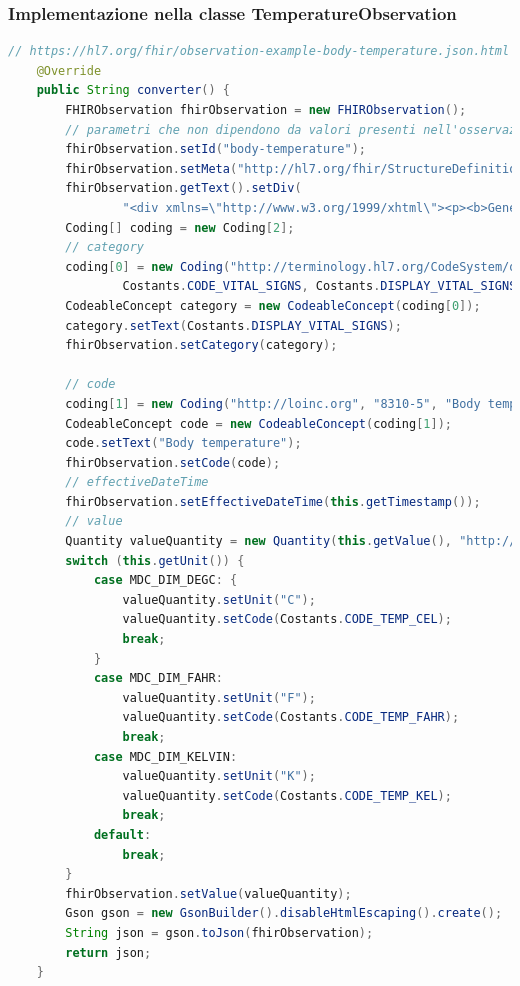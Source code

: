 \documentclass[a4paper]{article}
\begin{document}
\subsubsection*{Implementazione nella classe TemperatureObservation}
\begin{lstlisting}[language= Java, caption = Metodo converter per la classe TemperatureObservation]
    // https://hl7.org/fhir/observation-example-body-temperature.json.html
    @Override
    public String converter() {
        FHIRObservation fhirObservation = new FHIRObservation();
        // parametri che non dipendono da valori presenti nell'osservazione ACOM, ma che possiamo settare in base al tipo di osservazione
        fhirObservation.setId("body-temperature");
        fhirObservation.setMeta("http://hl7.org/fhir/StructureDefinition/vitalsigns");
        fhirObservation.getText().setDiv(
                "<div xmlns=\"http://www.w3.org/1999/xhtml\"><p><b>Generated Narrative: Observation</b><a name=\"body-temperature\">");
        Coding[] coding = new Coding[2];
        // category
        coding[0] = new Coding("http://terminology.hl7.org/CodeSystem/observation-category",
                Costants.CODE_VITAL_SIGNS, Costants.DISPLAY_VITAL_SIGNS);
        CodeableConcept category = new CodeableConcept(coding[0]);
        category.setText(Costants.DISPLAY_VITAL_SIGNS);
        fhirObservation.setCategory(category);

        // code
        coding[1] = new Coding("http://loinc.org", "8310-5", "Body temperature");
        CodeableConcept code = new CodeableConcept(coding[1]);
        code.setText("Body temperature");
        fhirObservation.setCode(code);
        // effectiveDateTime
        fhirObservation.setEffectiveDateTime(this.getTimestamp());
        // value
        Quantity valueQuantity = new Quantity(this.getValue(), "http://unitsofmeasure.org");
        switch (this.getUnit()) {
            case MDC_DIM_DEGC: {
                valueQuantity.setUnit("C");
                valueQuantity.setCode(Costants.CODE_TEMP_CEL);
                break;
            }
            case MDC_DIM_FAHR:
                valueQuantity.setUnit("F");
                valueQuantity.setCode(Costants.CODE_TEMP_FAHR);
                break;
            case MDC_DIM_KELVIN:
                valueQuantity.setUnit("K");
                valueQuantity.setCode(Costants.CODE_TEMP_KEL);
                break;
            default:
                break;
        }
        fhirObservation.setValue(valueQuantity);
        Gson gson = new GsonBuilder().disableHtmlEscaping().create();
        String json = gson.toJson(fhirObservation);
        return json;
    }
\end{lstlisting}
\end{document}
